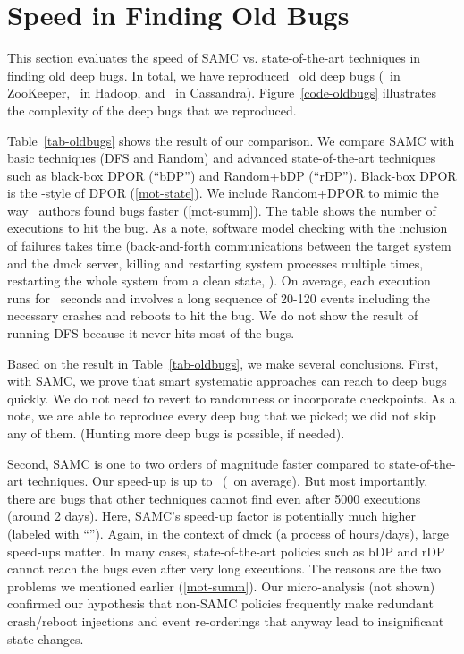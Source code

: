


\section{Speed in Finding Old Bugs}
\label{eval-oldbugs}






This section evaluates the speed of SAMC vs. state-of-the-art
techniques in finding old deep bugs.  In total, we have reproduced
\numOldDeepBugs\ old deep bugs (\numZkDeepBugs\ in ZooKeeper,
\numMrDeepBugs\ in Hadoop, and \numCsDeepBugs\ in Cassandra).
Figure~\ref{code-oldbugs} illustrates the complexity of the deep bugs
that we reproduced.



Table~\ref{tab-oldbugs} shows the result of our comparison.  We
compare SAMC with basic techniques (DFS and Random) and advanced
state-of-the-art techniques such as black-box DPOR (``bDP'') and
Random+bDP (``rDP'').  Black-box DPOR is the \modist-style of DPOR
(\sec\ref{mot-state}).  We include Random+DPOR to mimic the way
\modist\ authors found bugs faster (\sec\ref{mot-summ}).  The table
shows the number of executions to hit the bug.  As a note,
software model checking with the inclusion of failures
takes time (back-and-forth communications between the target system
and the dmck server, killing and restarting system processes multiple
times, restarting the whole system from a clean state, \etc).  On
average, each execution runs for \numAvgExecTime\ seconds and involves
a long sequence of 20-120 events including the necessary crashes and
reboots to hit the bug.  We do not show the result of running DFS
because it never hits most of the bugs.  


Based on the result in Table~\ref{tab-oldbugs}, we make several
conclusions.
%
First, with SAMC, we prove that smart systematic approaches can reach
to deep bugs quickly.  We do not need to revert to randomness or
incorporate checkpoints.  As a note, we are able to reproduce every
deep bug that we picked; we did not skip any of them.
%
(Hunting more deep bugs is possible, if needed).

Second, SAMC is one to two orders of magnitude faster compared to
state-of-the-art techniques.  Our speed-up is up to
\numMaxBugSpeedUp\ (\numAvgBugSpeedUp\ on average).  But most
importantly, there are bugs that other techniques cannot find even
after 5000 executions (around 2 days). Here, SAMC's speed-up factor is
potentially much higher (labeled with ``\uu'').  Again, in the context of
dmck (a process of hours/days), large speed-ups matter.  In many
cases, state-of-the-art policies such as bDP and rDP cannot reach the
bugs even after very long executions.  The reasons are the two
problems we mentioned earlier (\sec\ref{mot-summ}).  Our
micro-analysis (not shown) confirmed our hypothesis that non-SAMC
policies frequently make redundant crash/reboot injections and event
re-orderings that anyway lead to insignificant state changes.

